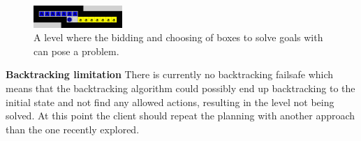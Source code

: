 \documentclass[Main]{subfiles}
\begin{document}
\begin{figure}[h!]
    \centering
    \includegraphics[width=0.3\textwidth]{shortcomings.png}
    \caption{A level where the bidding and choosing of boxes to solve goals with can pose a problem.}
    \label{fig:shortcomings}
\end{figure}


\textbf{Backtracking limitation}
There is currently no backtracking failsafe which means that the backtracking algorithm could possibly end up backtracking to the initial state and not find any allowed actions, resulting in the level not being solved. 
At this point the client should repeat the planning with another approach than the one recently explored. 
\end{document}
